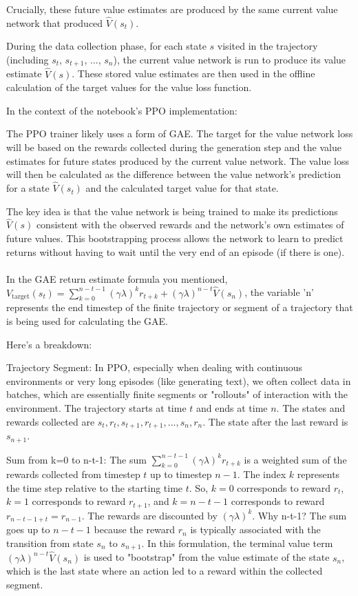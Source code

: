 \documentclass[10pt,a4paper]{report}
\begin{document}
Crucially, these future value estimates are produced by the same current value network that produced $\hat{V}(s_t)$.

During the data collection phase, for each state $s$ visited in the trajectory (including $s_t$, $s_{t+1}$, ..., $s_n$), the current value network is run to produce its value estimate $\hat{V}(s)$. These stored value estimates are then used in the offline calculation of the target values for the value loss function.

In the context of the notebook's PPO implementation:

The PPO trainer likely uses a form of GAE. The target for the value network loss will be based on the rewards collected during the generation step and the value estimates for future states produced by the current value network. The value loss will then be calculated as the difference between the value network's prediction for a state $\hat{V}(s_t)$ and the calculated target value for that state.

The key idea is that the value network is being trained to make its predictions $\hat{V}(s)$ consistent with the observed rewards and the network's own estimates of future values. This bootstrapping process allows the network to learn to predict returns without having to wait until the very end of an episode (if there is one).\\\\


In the GAE return estimate formula you mentioned, $V_{\text{target}}(s_t) = \sum_{k=0}^{n-t-1} (\gamma\lambda)^k r_{t+k} + (\gamma\lambda)^{n-t} \hat{V}(s_n)$, the variable 'n' represents the end timestep of the finite trajectory or segment of a trajectory that is being used for calculating the GAE.

Here's a breakdown:

    Trajectory Segment: In PPO, especially when dealing with continuous environments or very long episodes (like generating text), we often collect data in batches, which are essentially finite segments or "rollouts" of interaction with the environment. The trajectory starts at time $t$ and ends at time $n$. The states and rewards collected are $s_t, r_t, s_{t+1}, r_{t+1}, ..., s_n, r_n$. The state after the last reward is $s_{n+1}$.

    Sum from k=0 to n-t-1: The sum $\sum_{k=0}^{n-t-1} (\gamma\lambda)^k r_{t+k}$ is a weighted sum of the rewards collected from timestep $t$ up to timestep $n-1$. The index $k$ represents the time step relative to the starting time $t$. So, $k=0$ corresponds to reward $r_t$, $k=1$ corresponds to reward $r_{t+1}$, and $k=n-t-1$ corresponds to reward $r_{n-t-1+t} = r_{n-1}$. The rewards are discounted by $(\gamma\lambda)^k$.
    Why n-t-1? The sum goes up to $n-t-1$ because the reward $r_n$ is typically associated with the transition from state $s_n$ to $s_{n+1}$. In this formulation, the terminal value term $(\gamma\lambda)^{n-t} \hat{V}(s_n)$ is used to "bootstrap" from the value estimate of the state $s_n$, which is the last state where an action led to a reward within the collected segment.
\end{document}
